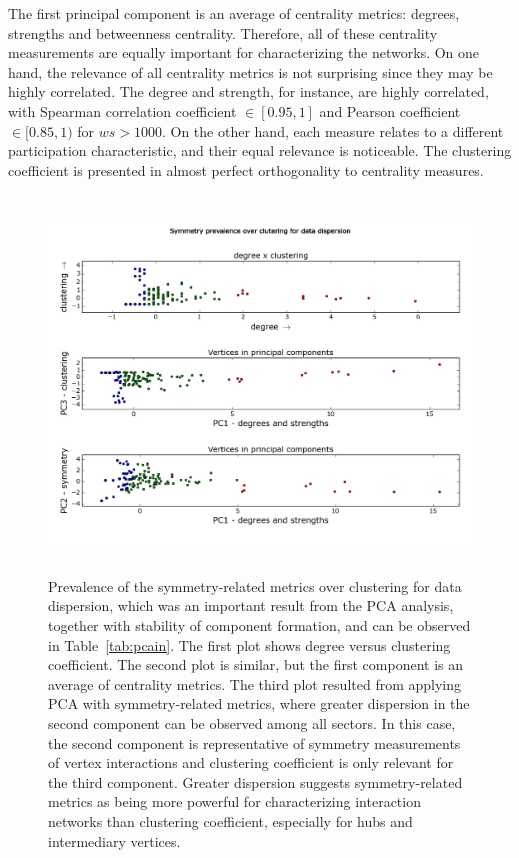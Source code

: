 \documentclass[%
 aip,
 jmp,%
 amsmath,amssymb,
 reprint,%
]{revtex4-1}
\begin{document}
The first principal component is an average of centrality metrics: degrees, strengths and betweenness centrality. Therefore, all of these centrality measurements are equally important for characterizing the networks. On one hand, the relevance of all centrality metrics is not surprising since they may be highly correlated. The degree and strength, for instance, are highly correlated, with Spearman correlation coefficient $\in [0.95,1]$ and Pearson coefficient $\in [0.85,1)$ for $ws>1000$.
On the other hand, each measure relates to a different participation characteristic, and their equal relevance is noticeable.
The clustering coefficient is presented in almost perfect orthogonality to centrality measures.
\begin{figure} 
   \centering
        \includegraphics[width=.6\textwidth,height=10cm]{figs/im13PCAPLOT_}
	\caption{Prevalence of the symmetry-related metrics over clustering for data dispersion, which was an important result from the PCA analysis, together with stability of component formation, and can be observed in Table~\ref{tab:pcain}.
		The first plot shows degree versus clustering coefficient.
		The second plot is similar, but the first component is an average of centrality metrics.
		The third plot resulted from applying PCA with symmetry-related metrics, where greater dispersion in the second component can be observed among all sectors.
		In this case, the second component is representative of symmetry measurements of vertex interactions and clustering coefficient is only relevant for the third component.
		Greater dispersion suggests symmetry-related metrics as being more powerful for characterizing interaction networks than clustering coefficient, especially for hubs and intermediary vertices.
}
\end{figure}
\end{document}
